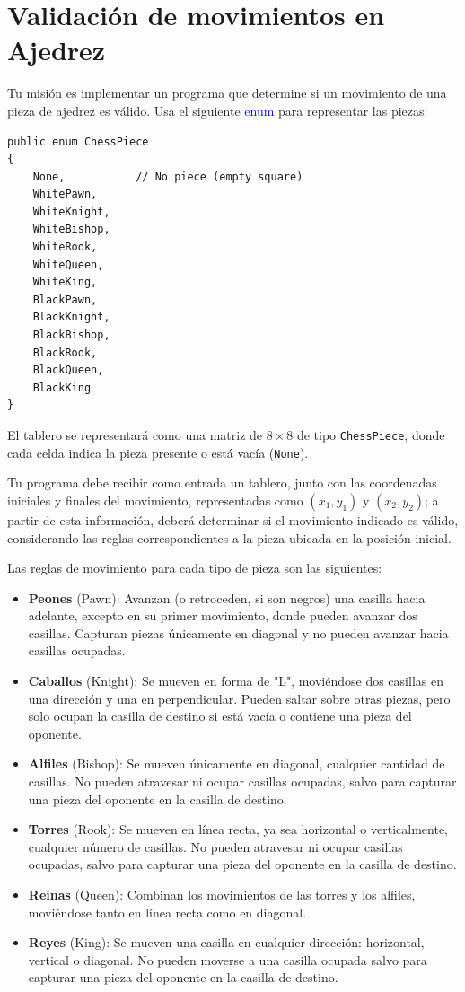 \section{Validación de movimientos en Ajedrez}
Tu misión es implementar un programa que determine si un movimiento de una pieza de ajedrez es válido. Usa el siguiente \textcolor{blue}{enum} para representar las piezas:

\begin{lstlisting}
public enum ChessPiece
{
    None,           // No piece (empty square)
    WhitePawn,
    WhiteKnight,
    WhiteBishop,
    WhiteRook,
    WhiteQueen,
    WhiteKing,
    BlackPawn,
    BlackKnight,
    BlackBishop,
    BlackRook,
    BlackQueen,
    BlackKing
}
\end{lstlisting}

El tablero se representará como una matriz de \(8 \times 8\) de tipo \texttt{ChessPiece}, donde cada celda indica la pieza presente o está vacía (\texttt{None}).

Tu programa debe recibir como entrada un tablero, junto con las coordenadas iniciales y finales del movimiento, representadas como \((x_1, y_1)\) y \((x_2, y_2)\); a partir de esta información, deberá determinar si el movimiento indicado es válido, considerando las reglas correspondientes a la pieza ubicada en la posición inicial.

Las reglas de movimiento para cada tipo de pieza son las siguientes:
\begin{itemize}
    \item \textbf{Peones} (Pawn): Avanzan (o retroceden, si son negros) una casilla hacia adelante, excepto en su primer movimiento, donde pueden avanzar dos casillas. Capturan piezas únicamente en diagonal y no pueden avanzar hacia casillas ocupadas.
    \item \textbf{Caballos} (Knight): Se mueven en forma de "L", moviéndose dos casillas en una dirección y una en perpendicular. Pueden saltar sobre otras piezas, pero solo ocupan la casilla de destino si está vacía o contiene una pieza del oponente.
    \item \textbf{Alfiles} (Bishop): Se mueven únicamente en diagonal, cualquier cantidad de casillas. No pueden atravesar ni ocupar casillas ocupadas, salvo para capturar una pieza del oponente en la casilla de destino.
    \item \textbf{Torres} (Rook): Se mueven en línea recta, ya sea horizontal o verticalmente, cualquier número de casillas. No pueden atravesar ni ocupar casillas ocupadas, salvo para capturar una pieza del oponente en la casilla de destino.
    \item \textbf{Reinas} (Queen): Combinan los movimientos de las torres y los alfiles, moviéndose tanto en línea recta como en diagonal.
    \item \textbf{Reyes} (King): Se mueven una casilla en cualquier dirección: horizontal, vertical o diagonal. No pueden moverse a una casilla ocupada salvo para capturar una pieza del oponente en la casilla de destino.
\end{itemize}


